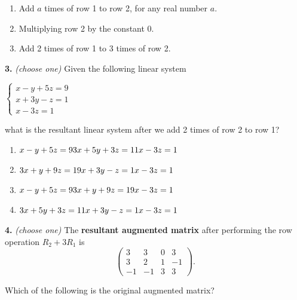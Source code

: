 \documentclass[10pt,a4paper]{article}
\begin{document}
\begin{enumerate}[label=(\Alph*)]
\item Add \(a\) times of row 1 to row 2, for any real number \(a\).
\item Multiplying row 2 by the constant 0.
\item Add 2 times of row 1 to 3  times of row 2.
\end{enumerate}
\smallskip
\textbf{3.} \textit{(choose one)} Given the following linear system

\(\left\{\begin{array}{c}x-y+5z=9\\x+3y-z=1\\x-3z=1\end{array}\right.\)

what is the resultant linear system after we add 2 times of row 2 to row 1?

\begin{enumerate}[label=(\Alph*)]
\item \(x-y+5z=9\\ 3x+5y+3z=11\\x-3z=1\)
\item \(3x+y+9z=19\\ x+3y-z=1\\ x-3z=1\)
\item \(x-y+5z=9\\3x+y+9z=19\\x-3z=1\)
\item \(3x+5y+3z=11\\x+3y-z=1\\x-3z=1\)
\end{enumerate}
\smallskip
\textbf{4.} \textit{(choose one)} The \textbf{resultant augmented matrix} after performing the row operation \(R_2+3R_1\) is \[\left(\begin{array}{ccc|c}      3  &   3  &   0  &   3\\      3  &   2  &   1  &  -1\\     -1  &  -1  &   3  &   3 \end{array}\right).\]

Which of the following is the original augmented matrix?
\end{document}
